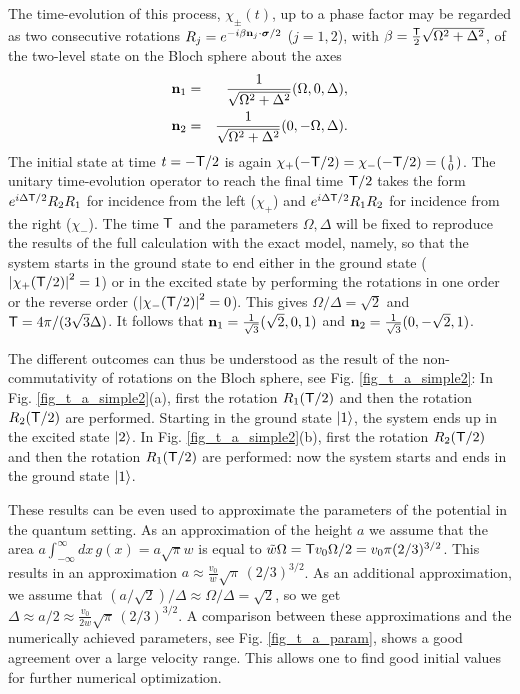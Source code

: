 The time-evolution of this process, $\chi_\pm (t)$,
up to a phase factor may be regarded as
two consecutive rotations $R_j=e^{-i{\beta}{\bf n}_j\cdot {\boldsymbol{\sigma}}/2}$ ($j=1,2$), with $\beta=\frac{{\sf T}}{2}\sqrt{\Omega^2+\Delta^2}$, of the two-level state on the Bloch sphere about the axes
%
\begin{eqnarray}
	{\bf n}_1&=&\frac{1}{\sqrt{\Omega^2+\Delta^2}}(\Omega,0,\Delta), %
	\\
	{\bf n}_2&=&\frac{1}{\sqrt{\Omega^2+\Delta^2}}(0,-\Omega,\Delta). %
\end{eqnarray}
%
The initial state at time $t=-{\sf T}/2$ is again $\chi_+ (-{\sf T}/2) = \chi_- (-{\sf T}/2) =\left(\begin{smallmatrix} 1\\ 0\end{smallmatrix}\right)$.
The unitary time-evolution operator to reach the final time ${\sf T}/2$ takes the form
$e^{i\Delta {\sf T}/2}R_2 R_1$ for  incidence from the left ($\chi_+$) and
$e^{i\Delta {\sf T}/2}R_1 R_2$ for incidence from the right ($\chi_-$).
The time ${\sf T}$ and the parameters $\Omega, \Delta$ will be fixed to reproduce the results of the full calculation with the exact model, namely,
so that the system starts in the ground state to end either in the ground state
($\left| \chi_{+} ({\sf T}/2) \right|^2 = 1$)
or in the excited state by performing the rotations in one order or the reverse order
($\left| \chi_{-} ({\sf T}/2) \right|^2 = 0$). This gives $\Omega/\Delta = \sqrt{2}$ and ${\sf T}= 4\pi/(3 \sqrt{3} \Delta)$. It follows that ${\bf n}_1=\frac{1}{\sqrt{3}}(\sqrt{2},0,1)$ and ${\bf n}_2=\frac{1}{\sqrt{3}}(0,-\sqrt{2},1)$.

The different outcomes can thus be understood as the result of the \linebreak non-commutativity of rotations on the Bloch sphere, see
Fig. \ref{fig_t_a_simple2}: In Fig. \ref{fig_t_a_simple2}(a), first the rotation $R_1({\sf T}/2)$ and then the rotation $R_2({\sf T}/2)$ are performed. Starting in the ground state $\ket{1}$, the system ends up  in the excited state $\ket{2}$.
In Fig. \ref{fig_t_a_simple2}(b),  first the rotation $R_2({\sf T}/2)$ and then the rotation $R_1({\sf T}/2)$ are performed:  now the system starts and ends  in the ground state $\ket{1}$.

These results can be even used to approximate the parameters of the potential in the quantum setting.
As an approximation of the height $a$ we assume that the area $a \int_{-\infty}^\infty dx \, g(x) = a \sqrt{\pi} w$
is equal to $\tilde w \Omega = {{\sf T}} v_0 \Omega/2 =
v_0 \pi ({2}/{3})^{3/2}$. This results in an
approximation $a \approx \frac{v_0}{w} \sqrt{\pi}\, ({2}/{3})^{3/2}$. As an additional approximation, we
assume that $(a/\sqrt{2})/\Delta \approx {\Omega}/{\Delta} = \sqrt{2}$, so we get
$\Delta \approx a/2 \approx \frac{v_0}{2 w} \sqrt{\pi}\, ({2}/{3})^{3/2}$. A comparison between
these approximations and the numerically achieved parameters, see Fig. \ref{fig_t_a_param}, shows a good agreement
over a large velocity range. This allows one to find good initial values for further numerical optimization.


